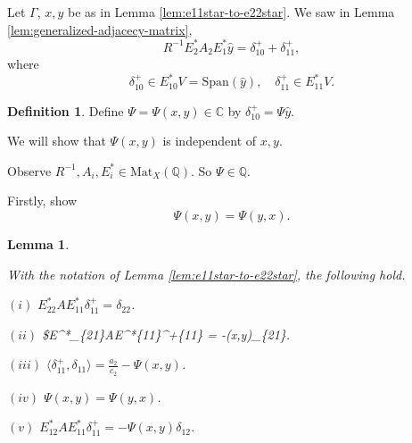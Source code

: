 \documentclass[
]{book}
\newtheorem{lemma}{Lemma}[chapter]
\theoremstyle{definition}
\newtheorem{definition}{Definition}[chapter]
\theoremstyle{definition}
\theoremstyle{definition}
\theoremstyle{definition}
\theoremstyle{remark}
\begin{document}
Let \(\Gamma\), \(x, y\) be as in Lemma \ref{lem:e11star-to-e22star}.
We saw in Lemma \ref{lem:generalized-adjacecy-matrix},
\[R^{-1}E^*_2A_2E^*_1\hat{y} = \delta^+_{10} + \delta^+_{11},\]
where
\[\delta^+_{10}\in E^*_{10}V = \mathrm{Span}(\hat{y}), \quad \delta^+_{11}\in E^*_{11}V.\]

\begin{definition}
\protect\hypertarget{def:Psi}{}\label{def:Psi}Define \(\Psi = \Psi(x,y) \in \mathbb{C}\) by \(\delta^+_{10} = \Psi\hat{y}\).
\end{definition}

We will show that \(\Psi(x,y)\) is independent of \(x, y\).

Observe \(R^{-1}, A_i, E^*_i\in \mathrm{Mat}_X(\mathbb{Q})\). So \(\Psi\in \mathbb{Q}\).

Firstly, show
\[\Psi(x,y) = \Psi(y,x).\]

\begin{lemma}
\protect\hypertarget{lem:map-e11star-to-e22star}{}\label{lem:map-e11star-to-e22star}

With the notation of Lemma \ref{lem:e11star-to-e22star}, the following hold.

\((i)\) \(E^*_{22}AE^*_{11}\delta^+_{11} = \delta_{22}\).

\((ii)\) \$E\^{}*\_\{21\}AE\^{}*\emph{\{11\}\delta\^{}+}\{11\} = -\Psi(x,y)\delta\_\{21\}.

\((iii)\) \(\langle \delta^+_{11}, \delta_{11}\rangle = \frac{a_2}{c_2} - \Psi(x,y)\).

\((iv)\) \(\Psi(x,y) = \Psi(y,x)\).

\((v)\) \(E^*_{12}AE^*_{11}\delta^+_{11} = -\Psi(x,y)\delta_{12}\).

\end{lemma}
\end{document}
